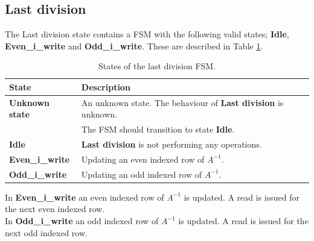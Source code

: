 \subsection{Last division}
The Last division state contains a FSM with the following valid states; \textbf{Idle}, \textbf{Even\_i\_write} and \textbf{Odd\_i\_write}. These are described in Table \ref{tab:fsm_last_division}.

\begin{table}[H]
\centering
 \resizebox{1\textwidth}{!}
{\begin{tabular}{l|l}
State                                                                                    & Description                                                                                   \\
\hline
\textbf{Unknown state}                                                                   & An unknown state. The behaviour of \textbf{Last division} is unknown. \\
&The FSM should transition to state \textbf{Idle}.                                    \\
\textbf{Idle}                                                                            & \textbf{Last division} is not performing any operations.                                          \\


\textbf{Even\_i\_write}                                                           & Updating an even indexed row of $A^{-1}$.       \\
\textbf{Odd\_i\_write}                                                                  & Updating an odd indexed row of $A^{-1}$.   
\end{tabular}}
\caption{States of the last division FSM.}
\label{tab:fsm_last_division}

\end{table}

In \textbf{Even\_i\_write} an even indexed row of $A^{-1}$ is updated. A read is issued for the next even indexed row. \\

In \textbf{Odd\_i\_write} an odd indexed row of $A^{-1}$ is updated. A read is issued for the next odd indexed row. 


